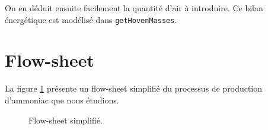 On en déduit ensuite facilement la quantité d'air à introduire.
Ce bilan énergétique est modélisé dans \texttt{getHovenMasses}.



\section{Flow-sheet}
\label{sec:flowsheet}

La figure \ref{fig:flowsheet} présente un flow-sheet simplifié du processus 
de production d'ammoniac que nous étudions.

\begin{figure}
	\begin{center}
		
	\end{center}
	\caption{Flow-sheet simplifié.}
	\label{fig:flowsheet}
\end{figure}

